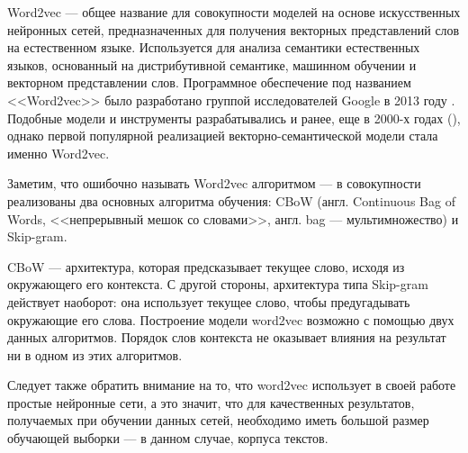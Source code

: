 Word2vec --- общее название для совокупности моделей на основе искусственных нейронных сетей, предназначенных для получения
векторных представлений слов на естественном языке. Используется для анализа семантики естественных языков, основанный 
на дистрибутивной семантике, машинном обучении и векторном представлении слов. Программное обеспечение под названием
<<Word2vec>> было разработано группой исследователей Google в 2013 году \cite{mikolov-etal-2013-linguistic,mikolov2013efficient}.
Подобные модели и инструменты разрабатывались и ранее, еще в 2000-х годах (\cite{bengio2003neural,collobert2008}),
однако первой популярной реализацией векторно-семантической модели стала именно Word2vec.

Заметим, что ошибочно называть Word2vec алгоритмом --- в совокупности реализованы два основных алгоритма обучения: 
CBoW (англ. Continuous Bag of Words, <<непрерывный мешок со словами>>, англ. bag — мультимножество) 
и Skip-gram. 

CBoW — архитектура, которая предсказывает текущее слово, исходя из окружающего его контекста. С другой стороны, архитектура
типа Skip-gram действует наоборот: она использует текущее слово, чтобы предугадывать окружающие его слова. 
Построение модели word2vec возможно с помощью двух данных алгоритмов. 
Порядок слов контекста не оказывает влияния на результат ни в одном из этих алгоритмов.

Следует также обратить внимание на то, что word2vec использует в своей работе простые нейронные сети, а это значит,
что для качественных результатов, получаемых при обучении данных сетей, необходимо иметь большой размер обучающей выборки ---
в данном случае, корпуса текстов.